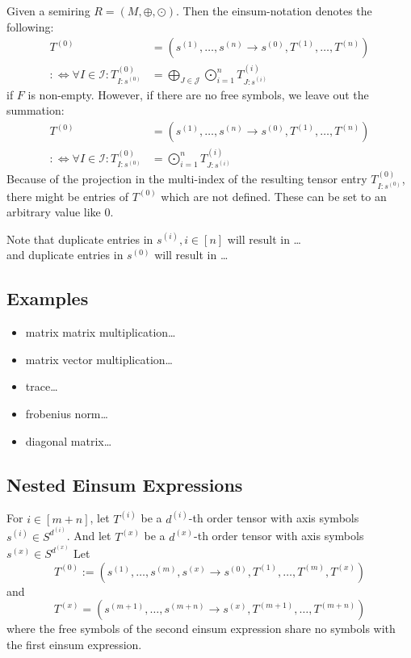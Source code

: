 Given a semiring $R = (M, \oplus, \odot)$. Then the einsum-notation denotes the following:
\begin{align*}
    T^{(0)}                                               & = (s^{(1)},\dots,s^{(n)} \rightarrow s^{(0)}, T^{(1)},\dots,T^{(n)})                   \\
    :\iff \forall I \in \mathcal{I}: T^{(0)}_{I: s^{(0)}} & = \bigoplus\limits_{J \in \mathcal{J}} \bigodot\limits_{i = 1}^{n} T^{(i)}_{J:s^{(i)}}
\end{align*}
if $F$ is non-empty. However, if there are no free symbols, we leave out the summation:
\begin{align*}
    T^{(0)}                                               & = (s^{(1)},\dots,s^{(n)} \rightarrow s^{(0)}, T^{(1)},\dots,T^{(n)}) \\
    :\iff \forall I \in \mathcal{I}: T^{(0)}_{I: s^{(0)}} & = \bigodot\limits_{i = 1}^{n} T^{(i)}_{J:s^{(i)}}
\end{align*}
Because of the projection in the multi-index of the resulting tensor entry $T^{(0)}_{I: s^{(0)}}$, there might be entries of $T^{(0)}$ which are not defined.
These can be set to an arbitrary value like 0.

Note that duplicate entries in $s^{(i)}, i \in [n]$ will result in \dots\\
and duplicate entries in $s^{(0)}$ will result in \dots

\subsection{Examples}

\begin{itemize}
    \item matrix matrix multiplication\dots
    \item matrix vector multiplication\dots
    \item trace\dots
    \item frobenius norm\dots
    \item diagonal matrix\dots
\end{itemize}

\subsection{Nested Einsum Expressions}

For $i \in [m + n]$, let $T^{(i)}$ be a $d^{(i)}$-th order tensor with axis symbols $s^{(i)} \in S^{d^{(i)}}$.
And let $T^{(x)}$ be a $d^{(x)}$-th order tensor with axis symbols $s^{(x)} \in S^{d^{(x)}}$
Let
$$T^{(0)} := (s^{(1)},\dots,s^{(m)}, s^{(x)} \rightarrow s^{(0)}, T^{(1)},\dots,T^{(m)}, T^{(x)})$$
and
$$T^{(x)} = (s^{(m + 1)},\dots,s^{(m + n)} \rightarrow s^{(x)}, T^{(m + 1)},\dots,T^{(m + n)})$$
where the free symbols of the second einsum expression share no symbols with the first einsum expression.

